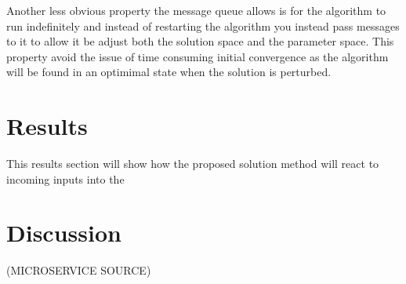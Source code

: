 \documentclass[preprint,12pt,authoryear]{elsarticle}
\begin{document}
Another less obvious property the message queue allows is for the algorithm to run indefinitely and instead of restarting the algorithm you instead pass messages to it to allow it be adjust both the solution space and the parameter space.
This property avoid the issue of time consuming initial convergence as the algorithm will be found in an optimimal state when the solution is perturbed.  

\section{Results}
This results section will show how the proposed solution method will react to incoming inputs into the 


\section{Discussion}
(MICROSERVICE SOURCE)





\end{document}
